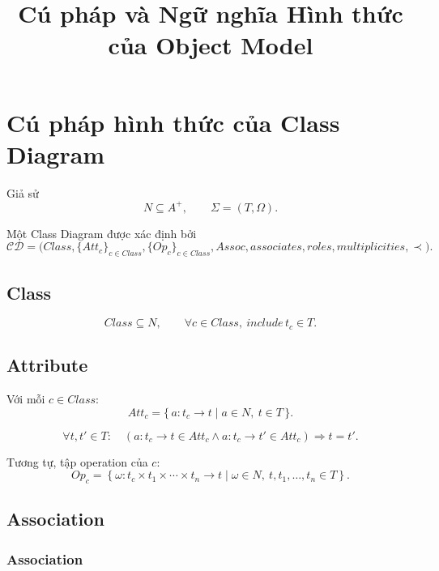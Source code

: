 \documentclass[12pt,a4paper]{article}
\title{Cú pháp và Ngữ nghĩa Hình thức của Object Model\\}
\date{}
\theoremstyle{definition}
\begin{document}
\maketitle


\section{Cú pháp hình thức của Class Diagram}

Giả sử
\[
N\subseteq A^{+},
\qquad
\Sigma=(T,\Omega).
\]

Một Class Diagram được xác định bởi
\[
\mathcal{CD}
=
\bigl(
Class,\{Att_c\}_{c\in Class},\{Op_c\}_{c\in Class},
Assoc,associates,roles,multiplicities,\prec
\bigr).
\]


\subsection{Class}

\[
Class \subseteq N,
\qquad
\forall c \in Class,\ {include} \, t_c \in T.
\]


\subsection{Attribute}

Với mỗi $c\in Class$:
\[
Att_c
=
\{\,a:t_c\to t\mid a\in N,\ t\in T\,\}.
\]

\[
\forall t,t'\in T:
\quad
(a:t_c\to t\in Att_c
\land
a:t_c\to t'\in Att_c)
\Rightarrow t=t'.
\]

Tương tự, tập operation của $c$:
\[
Op_c
=
\left\{
\omega:t_c\times t_1\times\cdots\times t_n\to t
\mid
\omega\in N,\ t,t_1,\ldots,t_n\in T
\right\}.
\]


\subsection{Association}

\subsubsection{Association}
\end{document}

